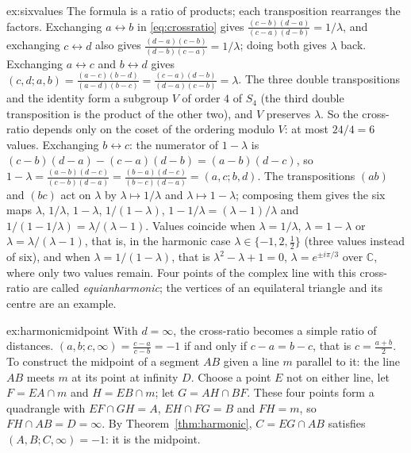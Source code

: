 \begin{solution}{ex:sixvalues}
\idea The formula is a ratio of products; each transposition rearranges the factors.
\writeup Exchanging $a\leftrightarrow b$ in \eqref{eq:crossratio} gives $\frac{(c-b)(d-a)}{(c-a)(d-b)}=1/\lambda$, and exchanging $c\leftrightarrow d$
also gives $\frac{(d-a)(c-b)}{(d-b)(c-a)}=1/\lambda$; doing both gives $\lambda$ back. Exchanging $a\leftrightarrow c$ and $b\leftrightarrow d$ gives
$(c,d;a,b)=\frac{(a-c)(b-d)}{(a-d)(b-c)}=\frac{(c-a)(d-b)}{(d-a)(c-b)}=\lambda$. The three double transpositions and the identity form a subgroup $V$ of
order $4$ of $S_4$ (the third double transposition is the product of the other two), and $V$ preserves $\lambda$. So the cross-ratio depends
only on the coset of the ordering modulo $V$: at most $24/4=6$ values.
Exchanging $b\leftrightarrow c$: the numerator of $1-\lambda$ is $(c-b)(d-a)-(c-a)(d-b)=(a-b)(d-c)$, so
$1-\lambda=\frac{(a-b)(d-c)}{(c-b)(d-a)}=\frac{(b-a)(d-c)}{(b-c)(d-a)}=(a,c;b,d)$. The transpositions $(ab)$ and $(bc)$ act on $\lambda$ by
$\lambda\mapsto1/\lambda$ and $\lambda\mapsto1-\lambda$; composing them gives the six maps $\lambda$, $1/\lambda$, $1-\lambda$, $1/(1-\lambda)$,
$1-1/\lambda=(\lambda-1)/\lambda$ and $1/(1-1/\lambda)=\lambda/(\lambda-1)$. Values coincide when $\lambda=1/\lambda$, $\lambda=1-\lambda$ or
$\lambda=\lambda/(\lambda-1)$, that is, in the harmonic case $\lambda\in\{-1,2,\frac12\}$ (three values instead of six), and when $\lambda=1/(1-\lambda)$,
that is $\lambda^2-\lambda+1=0$, $\lambda=e^{\pm i\pi/3}$ over $\mathbb C$, where only two values remain. Four points of the complex line with this
cross-ratio are called \emph{equianharmonic}; the vertices of an equilateral triangle and its centre are an example.
\end{solution}

\begin{solution}{ex:harmonicmidpoint}
\idea With $d=\infty$, the cross-ratio becomes a simple ratio of distances.
\writeup $(a,b;c,\infty)=\frac{c-a}{c-b}=-1$ if and only if $c-a=b-c$, that is $c=\frac{a+b}2$. To construct the midpoint of a segment $AB$
given a line $m$ parallel to it: the line $AB$ meets $m$ at its point at infinity $D$. Choose a point $E$ not on either line, let $F=EA\cap m$ and
$H=EB\cap m$; let $G=AH\cap BF$. These four points form a quadrangle with $EF\cap GH=A$, $EH\cap FG=B$ and $FH=m$, so $FH\cap AB=D=\infty$. By
Theorem~\ref{thm:harmonic}, $C=EG\cap AB$ satisfies $(A,B;C,\infty)=-1$: it is the midpoint.
\end{solution}

